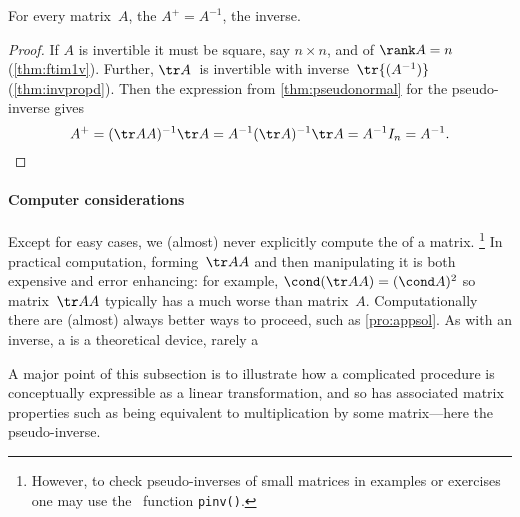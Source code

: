 \begin{theorem} \label{thm:pinvinv}
For every  matrix~\(A\), the  \(A^+=A^{-1}\), the inverse.
\end{theorem}
\begin{proof} 
If \(A\) is invertible it must be square, say \(n\times n\), and of \(\rank A=n\) (\cref{thm:ftim1v}).
Further, \(\tr A\)~is invertible with inverse~\(\tr{(A^{-1})}\) (\cref{thm:invpropd}).
Then the expression from \cref{thm:pseudonormal} for the pseudo-inverse gives
\begin{equation*}
A^+=(\tr AA)^{-1}\tr A
=A^{-1}(\tr A)^{-1}\tr A
=A^{-1}I_n=A^{-1}.
\end{equation*}
\end{proof}




\paragraph{Computer considerations} 
Except for easy cases, we (almost) never explicitly compute the  of a matrix.%
\footnote{However, to check pseudo-inverses of small matrices in examples or exercises one may use the \script\ function \texttt{pinv()}.}
In practical computation, forming~\(\tr AA\) and then manipulating it is both expensive and error enhancing: for example, \(\cond(\tr AA)=(\cond A)^2\) so matrix~\(\tr AA\) typically has a much worse  than matrix~\(A\).
Computationally there are (almost) always better ways to proceed, such as \cref{pro:appsol}.
As with an inverse, a  is a theoretical device, rarely a 

A major point of this subsection is to illustrate how a complicated procedure is conceptually expressible as a linear transformation, and so has associated matrix properties such as being equivalent to multiplication by some matrix---here the pseudo-inverse.







\begin{comment}
connect to normal equation?  Possibly establish the Penrose conditions, \(AA^+A=A\), \(A^+AA^+=A^+\), and \(AA^+\) and \(A^+A\) are symmetric, but as yet I do not see any need.
\end{comment}







